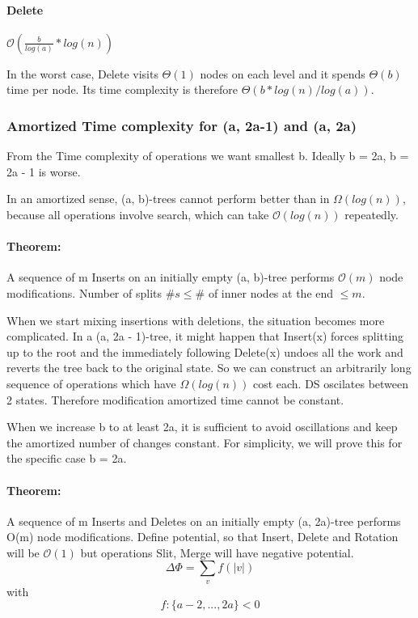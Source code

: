 \documentclass[12pt]{article}
\newcommand{\bigO}{\mathcal{O}}
\begin{document}
\paragraph{Delete} $\bigO(\frac{b}{log(a)}*log(n))$


In the worst case, Delete visits $\Theta(1)$ nodes on each level and it spends $\Theta(b)$ time per node. Its time complexity is therefore $\Theta(b * log(n)/log(a))$.

\subsubsection{Amortized Time complexity for (a, 2a-1) and (a, 2a) }
From the Time complexity of operations we want smallest b. Ideally b = 2a, b = 2a - 1 is worse.

In an amortized sense, (a, b)-trees cannot perform better than in $\Omega(log(n))$, because all operations involve search, which can take $\bigO(log(n))$ repeatedly.

\paragraph{Theorem:} A sequence of m Inserts on an initially empty (a, b)-tree performs $\bigO(m)$ node modifications.
Number of splits $ \#s \leq \# $ of inner nodes at the end $ \leq m$.

When we start mixing insertions with deletions, the situation becomes more complicated.
In a (a, 2a - 1)-tree, it might happen that Insert(x) forces splitting up to the root and
the immediately following Delete(x) undoes all the work and reverts the tree back to the original state. So we can construct an arbitrarily long sequence of operations which have $\Omega(log(n))$ cost each.
DS oscilates between 2 states. Therefore modification amortized time cannot be constant.

When we increase b to at least 2a, it is sufficient to avoid oscillations and keep the amortized number of changes constant.
For simplicity, we will prove this for the specific case b = 2a.

\paragraph{Theorem:} A sequence of m Inserts and Deletes on an initially empty (a, 2a)-tree performs O(m) node modifications.
Define potential, so that Insert, Delete and Rotation will be $\bigO(1)$ but operations Slit, Merge will have negative potential.
\[ \Delta \Phi = \sum_{v} f(|v|)  \]
with
\[ f:\{ a-2, ..., 2a \} < 0 \]
\end{document}
